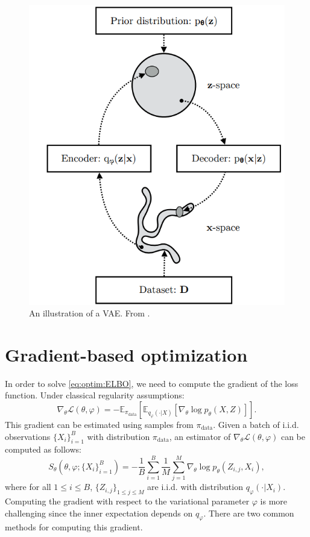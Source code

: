 \documentclass[english,graybox,envcountchap,envcountsame,sectrefs,shortlabels]{svmono}
\theoremstyle{style}
\newcommand{\eqsp}{}
\begin{document}
\begin{figure}
\centering
\includegraphics[scale=0.8]{vae.png}
\caption{An illustration of a VAE. From \cite{kingma2019introduction}.}
\label{fig:vae}
\end{figure}

\section{Gradient-based optimization}
In order to solve \eqref{eq:optim:ELBO}, we need to compute the gradient of the loss function. Under classical regularity assumptions:
$$
\nabla_{\theta} \mathcal{L}(\theta, \varphi) = -\mathbb{E}_{\pi_{\mathrm{data}}} \left[\mathbb{E}_{q_{\varphi}(\cdot|X)}\left[ \nabla_{\theta} \log p_{\theta}(X, Z)\right]\right]\eqsp.
$$
This gradient can be estimated using samples from $\pi_{\mathrm{data}}$. Given a batch of i.i.d. observations $\{X_i\}_{i=1}^B$ with distribution $\pi_{\mathrm{data}}$, an estimator of $\nabla_{\theta} \mathcal{L}(\theta, \varphi)$  can be computed as follows:
$$
S_{\theta}(\theta, \varphi;\{X_i\}_{i=1}^B) = -\frac{1}{B}\sum_{i=1}^B\frac{1}{M}\sum_{j=1}^M \nabla_\theta \log p_\theta(Z_{i,j},X_i)\eqsp,
$$
where for all $1\leqslant i \leqslant B$, $\{Z_{i,j}\}_{1\leqslant j\leqslant M}$ are i.i.d. with distribution $q_{\varphi}(\cdot|X_i)$.
Computing the gradient with respect to the variational parameter $\varphi$ is more challenging since the inner expectation depends on  $q_{\varphi}$. There are two common methods for computing this gradient. 
\end{document}
